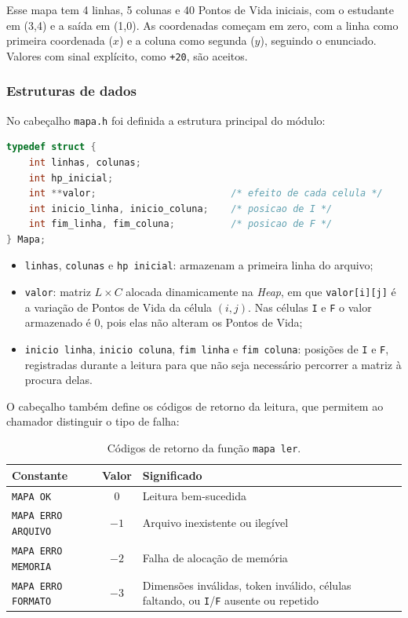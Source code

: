 \documentclass[12pt,a4paper]{article}
\makeatletter
\DeclareRobustCommand{\_}{%
  \ifmmode
    \nfss@text{\textunderscore}%
  \else
    \textunderscore\allowbreak
  \fi
}
\makeatother
\begin{document}
Esse mapa tem 4 linhas, 5 colunas e 40 Pontos de Vida iniciais, com o estudante em (3,4) e a saída em (1,0). As coordenadas começam em zero, com a linha como primeira coordenada ($x$) e a coluna como segunda ($y$), seguindo o enunciado. Valores com sinal explícito, como \texttt{+20}, são aceitos.
 
\subsubsection*{Estruturas de dados}
 
No cabeçalho \texttt{mapa.h} foi definida a estrutura principal do módulo:
 
\begin{lstlisting}[language=C, caption={Estrutura Mapa, que representa a caverna em memória.}]
typedef struct {
    int linhas, colunas;
    int hp_inicial;
    int **valor;                        /* efeito de cada celula */
    int inicio_linha, inicio_coluna;    /* posicao de I */
    int fim_linha, fim_coluna;          /* posicao de F */
} Mapa;
\end{lstlisting}
 
\begin{itemize}
    \item \texttt{linhas}, \texttt{colunas} e \texttt{hp\_inicial}: armazenam a primeira linha do arquivo;
    \item \texttt{valor}: matriz $L \times C$ alocada dinamicamente na \textit{Heap}, em que \texttt{valor[i][j]} é a variação de Pontos de Vida da célula $(i,j)$. Nas células \texttt{I} e \texttt{F} o valor armazenado é 0, pois elas não alteram os Pontos de Vida;
    \item \texttt{inicio\_linha}, \texttt{inicio\_coluna}, \texttt{fim\_linha} e \texttt{fim\_coluna}: posições de \texttt{I} e \texttt{F}, registradas durante a leitura para que não seja necessário percorrer a matriz à procura delas.
\end{itemize}
 
O cabeçalho também define os códigos de retorno da leitura, que permitem ao chamador distinguir o tipo de falha:
 
\begin{table}[htbp]
\centering
\small
\caption{Códigos de retorno da função \texttt{mapa\_ler}.}
\label{tab:codigos}
\vspace{0.2cm}
\begin{tabularx}{\textwidth}{|>{\raggedright\arraybackslash}p{4.2cm}|c|>{\raggedright\arraybackslash}X|}
\hline
\textbf{Constante} & \textbf{Valor} & \textbf{Significado} \\
\hline
\texttt{MAPA\_OK} & 0 & Leitura bem-sucedida \\
\hline
\texttt{MAPA\_ERRO\_ARQUIVO} & $-1$ & Arquivo inexistente ou ilegível \\
\hline
\texttt{MAPA\_ERRO\_MEMORIA} & $-2$ & Falha de alocação de memória \\
\hline
\texttt{MAPA\_ERRO\_FORMATO} & $-3$ & Dimensões inválidas, token inválido, células faltando, ou \texttt{I}/\texttt{F} ausente ou repetido \\
\hline
\end{tabularx}
\end{table}
 
\end{document}

